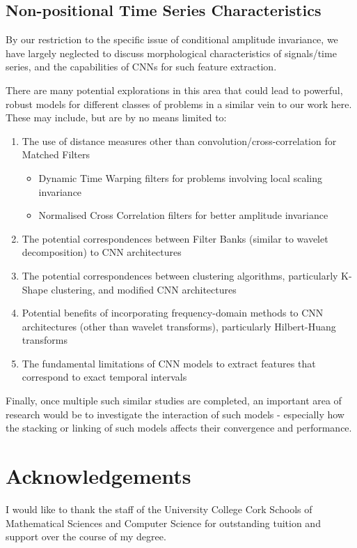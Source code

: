 \documentclass[9pt,conference]{IEEEtran}
\begin{document}
\subsection{Non-positional Time Series Characteristics}
By our restriction to the specific issue of conditional amplitude invariance, we have largely neglected to discuss morphological characteristics of signals/time series, and the capabilities of CNNs for such feature extraction.

There are many potential explorations in this area that could lead to powerful, robust models for different classes of problems in a similar vein to our work here. These may include, but are by no means limited to:
\begin{enumerate}
    \item The use of distance measures other than convolution/cross-correlation for Matched Filters
    \begin{itemize}
         \item Dynamic Time Warping filters for problems involving local scaling invariance
         \item Normalised Cross Correlation filters for better amplitude invariance
        \end{itemize}
    \item The potential correspondences between Filter Banks (similar to wavelet decomposition) to CNN architectures
    \item The potential correspondences between clustering algorithms, particularly K-Shape\cite{paparrizos2015k} clustering, and modified CNN architectures
    \item Potential benefits of incorporating frequency-domain methods to CNN architectures (other than wavelet transforms), particularly Hilbert-Huang transforms
    \item The fundamental limitations of CNN models to extract features that correspond to exact temporal intervals
\end{enumerate}

Finally, once multiple such similar studies are completed, an important area of research would be to investigate the interaction of such models - especially how the stacking or linking of such models affects their convergence and performance.

\section{Acknowledgements}
I would like to thank the staff of the University College Cork Schools of Mathematical Sciences and Computer Science for outstanding tuition and support over the course of my degree.
\end{document}
